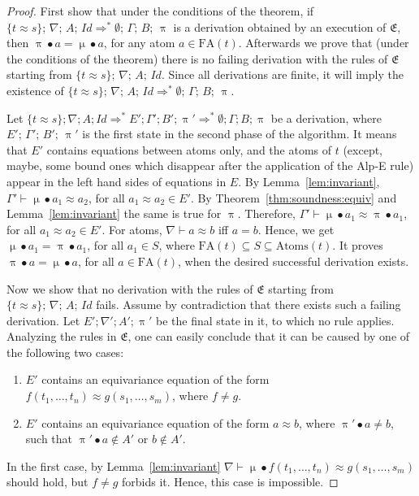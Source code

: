 \documentclass[11pt,a4paper]{amsart}
\theoremstyle{definition}
\newcommand{\Lra}{\Longrightarrow}
\newcommand{\idp}{\mathit{Id}}
\newcommand{\perm}{\approx}
\newcommand{\permef}{\bullet}
\newcommand\ppi{\uppi}
\newcommand\pmu{\upmu}
\newcommand{\msys}{\mathfrak{E}}
\newcommand{\Atoms}{A}
\newcommand{\atoms}{\mathrm{Atoms}}
\newcommand{\nablai}{{\nabla}}
\newcommand{\nablag}{\Gamma}
\newcommand{\fatom}{\mathrm{FA}}
\begin{document}
\begin{proof}
  First show that under the conditions of the theorem, if $ \{t\perm
  s\} ;\,\allowbreak \nablai ;\,\allowbreak \Atoms ;\,\allowbreak \idp
  \Lra^* \emptyset ;\, \nablag;\, B ;\, \ppi $ is a derivation
  obtained by an execution of $\msys$, then $\ppi\permef a =
  \pmu\permef a$, for any atom $a\in\fatom(t)$. Afterwards we prove
  that (under the conditions of the theorem) there is no failing
  derivation with the rules of $\msys$ starting from $\{t\perm s\}
  ;\,\allowbreak \nablai ;\,\allowbreak \Atoms ;\,\allowbreak
  \idp$. Since all derivations are finite, it will imply the existence
  of $ \{t\perm s\} ;\,\allowbreak \nablai ;\,\allowbreak \Atoms
  ;\,\allowbreak \idp \Lra^* \emptyset ;\, \nablag;\, B ;\, \ppi $.

  Let $\{t\perm s\} ;\allowbreak \nablai ;\allowbreak \Atoms
  ;\allowbreak \idp \Lra^* E'; \nablag'; B' ;\allowbreak \ppi' \Lra^*
  \emptyset ; \nablag; B ;\ppi $ be a derivation, where $E' ;\,
  \nablag';\, B' ;\, \ppi'$ is the first state in the second phase of
  the algorithm. It means that $E'$ contains equations between atoms
  only, and the atoms of $t$ (except, maybe, some bound ones which
  disappear after the application of the {\sf Alp-E} rule) appear in
  the left hand sides of equations in $E$. By
  Lemma~\ref{lem:invariant}, $\nablag' \vdash \pmu \permef a_1 \approx
  a_2 $, for all $a_1\perm a_2\in E'$. By
  Theorem~\ref{thm:soundness:equiv} and Lemma~\ref{lem:invariant} the
  same is true for $\ppi$. Therefore, $\nablag' \vdash \pmu \permef
  a_1 \approx \ppi \permef a_1 $, for all $a_1\perm a_2\in E'$. For
  atoms, $\nabla \vdash a\approx b$ iff $a=b$. Hence, we get
  $\pmu\permef a_1 = \ppi\permef a_1$, for all $a_1\in S$, where
  $\fatom(t)\subseteq S \subseteq \atoms(t)$. It proves $\ppi\permef a=
  \pmu\permef a$, for all $a\in\fatom(t)$, when the desired successful
  derivation exists.

  Now we show that no derivation with the rules of $\msys$ starting
  from $ \{t\perm s\} ;\,\allowbreak \nablai
  ;\,\allowbreak \Atoms ;\,\allowbreak \idp$ fails. Assume by
  contradiction that there exists such a failing derivation. Let
  $E';\nabla';A';\ppi'$ be the final state in it, to which no rule
  applies. Analyzing the rules in $\msys$, one can easily conclude
  that it can be caused by one of the following two cases:
\begin{enumerate}
  \item $E'$ contains an equivariance equation of the form
    $f(t_1,\ldots,t_n)\perm g(s_1,\ldots,\allowbreak s_m)$, where $f\neq g$.
  \item $E'$ contains an equivariance equation of the form $a\perm b$,
    where $\ppi'\permef a \neq b$, such that $\ppi'\permef
    a\notin A'$ or $b \notin A'$.
\end{enumerate} 
   In the first case, by Lemma~\ref{lem:invariant} $\nabla \vdash \pmu
   \permef f(t_1,\ldots,t_n) \approx g(s_1,\ldots,s_m)$ should hold,
   but $f\neq g$ forbids it. Hence, this case is impossible.


\end{proof}
\end{document}
